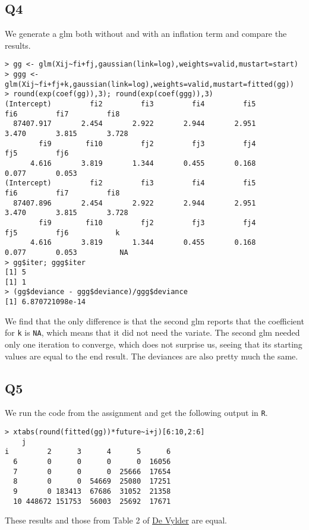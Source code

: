 \documentclass[11pt]{article}
\begin{document}
\subsection*{Q4}

We generate a glm both without and with an inflation term and compare the results.

\begin{verbatim}
> gg <- glm(Xij~fi+fj,gaussian(link=log),weights=valid,mustart=start)
> ggg <- glm(Xij~fi+fj+k,gaussian(link=log),weights=valid,mustart=fitted(gg))
> round(exp(coef(gg)),3); round(exp(coef(ggg)),3)
(Intercept)         fi2         fi3         fi4         fi5         fi6         fi7         fi8 
  87407.917       2.454       2.922       2.944       2.951       3.470       3.815       3.728 
        fi9        fi10         fj2         fj3         fj4         fj5         fj6 
      4.616       3.819       1.344       0.455       0.168       0.077       0.053 
(Intercept)         fi2         fi3         fi4         fi5         fi6         fi7         fi8 
  87407.896       2.454       2.922       2.944       2.951       3.470       3.815       3.728 
        fi9        fi10         fj2         fj3         fj4         fj5         fj6           k 
      4.616       3.819       1.344       0.455       0.168       0.077       0.053          NA 
> gg$iter; ggg$iter
[1] 5
[1] 1
> (gg$deviance - ggg$deviance)/ggg$deviance
[1] 6.870721098e-14
\end{verbatim}

We find that the only difference is that the second glm reports that the coefficient for \verb|k| is \verb|NA|, which means that it did not need the variate. The second glm needed only one iteration to converge, which does not surprise us, seeing that its starting values are equal to the end result. The deviances are also pretty much the same. 

\subsection*{Q5}

We run the code from the assignment and get the following output in \verb|R|.

\begin{verbatim}
> xtabs(round(fitted(gg))*future~i+j)[6:10,2:6]
    j
i         2      3      4      5      6
  6       0      0      0      0  16056
  7       0      0      0  25666  17654
  8       0      0  54669  25080  17251
  9       0 183413  67686  31052  21358
  10 448672 151753  56003  25692  17671
\end{verbatim}

These results and those from Table 2 of \href{http://www1.fee.uva.nl/ke/act/people/kaas/DeVylder78.pdf}{De Vylder} are equal.
\end{document}
